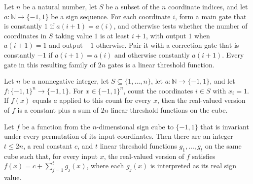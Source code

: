 \begin{theorem}
\label{FABL.profileDecompositionGates_isLinearThreshold}
\leanok
{}
Let $n$ be a natural number, let $S$ be a subset of the $n$ coordinate indices, and let
$a:\mathbb{N}\to\{−1,1\}$ be a sign sequence. For each coordinate $i$, form a main gate
that is constantly $1$ if $a(i+1)=a(i)$, and otherwise tests whether the number of
coordinates in $S$ taking value $1$ is at least $i+1$, with output $1$ when $a(i+1)=1$
and output $-1$ otherwise. Pair it with a correction gate that is constantly $-1$ if
$a(i+1)=a(i)$ and otherwise constantly $a(i+1)$. Every gate in this resulting family of
$2n$ gates is a linear threshold function.
\end{theorem}

\begin{theorem}
\label{FABL.isRealSumOfLinearThresholds_of_count_profile}
\leanok
{}
Let $n$ be a nonnegative integer, let $S\subseteq\{1,\ldots,n\}$, let
$a:\mathbb{N}\to\{-1,1\}$, and let $f:\{-1,1\}^n\to\{-1,1\}$. For $x\in\{-1,1\}^n$,
count the coordinates $i\in S$ with $x_i=1$. If $f(x)$ equals $a$ applied to this count
for every $x$, then the real-valued version of $f$ is a constant plus a sum of $2n$
linear threshold functions on the cube.
\end{theorem}

\begin{theorem}
\label{FABL.symmetric_hasRealSumOfLinearThresholdsSizeAtMost_two_mul}
\leanok
{}
Let $f$ be a function from the $n$-dimensional sign cube to $\{−1,1\}$ that is
invariant under every permutation of its input coordinates. Then there are an integer
$t\le 2n$, a real constant $c$, and $t$ linear threshold functions $g_1,\ldots,g_t$ on
the same cube such that, for every input $x$, the real-valued version of $f$ satisfies
$f(x)=c+\sum_{j=1}^t g_j(x)$, where each $g_j(x)$ is interpreted as its real sign
value.
\end{theorem}

